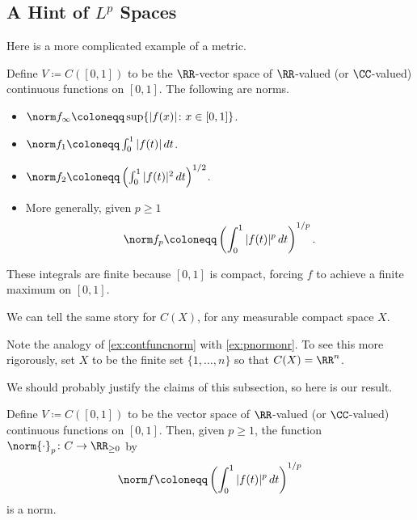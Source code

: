 \documentclass[../notes.tex]{subfiles}
\begin{document}
\subsection{A Hint of \texorpdfstring{$L^p$}{Lp} Spaces}
Here is a more complicated example of a metric.
\begin{example} \label{ex:contfuncnorm}
	Define $V\coloneqq C([0,1])$ to be the $\RR$-vector space of $\RR$-valued (or $\CC$-valued) continuous functions on $[0,1]$. The following are norms.
	\begin{itemize}
		\item $\norm f_\infty\coloneqq\sup\{|f(x)|\colon x\in[0,1]\}$.
		\item $\norm f_1\coloneqq\int_0^1|f(t)|\,dt$.
		\item $\norm f_2\coloneqq\left(\int_0^1|f(t)|^2\,dt\right)^{1/2}$.
		\item More generally, given $p\ge1$
		\[\norm f_p\coloneqq\left(\int_0^1|f(t)|^p\,dt\right)^{1/p}.\]
	\end{itemize}
	These integrals are finite because $[0,1]$ is compact, forcing $f$ to achieve a finite maximum on $[0,1]$.
\end{example}
\begin{remark}
	We can tell the same story for $C(X)$, for any measurable compact space $X$.
\end{remark}
\begin{remark} \label{rem:hintoflp}
	Note the analogy of \autoref{ex:contfuncnorm} with \autoref{ex:pnormonr}. To see this more rigorously, set $X$ to be the finite set $\{1,\ldots,n\}$ so that $C(X)=\RR^n$.
\end{remark}
We should probably justify the claims of this subsection, so here is our result.
\begin{proposition}
	Define $V\coloneqq C([0,1])$ to be the vector space of $\RR$-valued (or $\CC$-valued) continuous functions on $[0,1]$. Then, given $p\ge1$, the function $\norm{\cdot}_p\colon C\to\RR_{\ge0}$ by
	\[\norm f\coloneqq\left(\int_0^1|f(t)|^p\,dt\right)^{1/p}\]
	is a norm.
\end{proposition}
\end{document}
